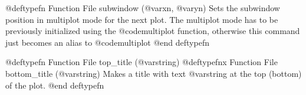 @deftypefn {Function File} {} subwindow (@var{xn}, @var{yn})
Sets the subwindow position in multiplot mode for the next plot.  The
multiplot mode has to be previously initialized using the
@code{multiplot} function, otherwise this command just becomes an alias
to @code{multiplot}
@end deftypefn

@deftypefn {Function File} {} top_title (@var{string})
@deftypefnx {Function File} {} bottom_title (@var{string})
Makes a title with text @var{string} at the top (bottom) of the plot.
@end deftypefn
